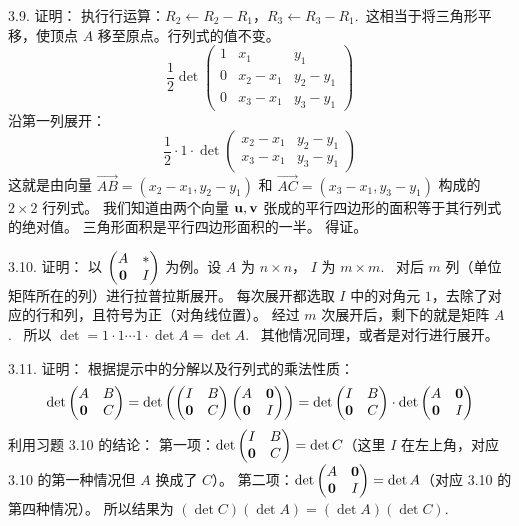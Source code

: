 \begin{exer}
3.9. 证明：
执行行运算：$R_2 \leftarrow R_2 - R_1$，$R_3 \leftarrow R_3 - R_1$.~这相当于将三角形平移，使顶点 $A$ 移至原点。行列式的值不变。
$$ \frac{1}{2} \det \begin{pmatrix} 1 & x_1 & y_1 \\ 0 & x_2-x_1 & y_2-y_1 \\ 0 & x_3-x_1 & y_3-y_1 \end{pmatrix} $$
沿第一列展开：
$$ \frac{1}{2} \cdot 1 \cdot \det \begin{pmatrix} x_2-x_1 & y_2-y_1 \\ x_3-x_1 & y_3-y_1 \end{pmatrix} $$
这就是由向量 $\vec{AB} = (x_2-x_1, y_2-y_1)$ 和 $\vec{AC} = (x_3-x_1, y_3-y_1)$ 构成的 $2 \times 2$ 行列式。
我们知道由两个向量 $\mathbf{u}, \mathbf{v}$ 张成的平行四边形的面积等于其行列式的绝对值。
三角形面积是平行四边形面积的一半。
得证。

3.10. 证明：
以 $\begin{pmatrix} A & * \\ \mathbf{0} & I \end{pmatrix}$ 为例。设 $A$ 为 $n \times n$， $I$ 为 $m \times m$.~
对后 $m$ 列（单位矩阵所在的列）进行拉普拉斯展开。
每次展开都选取 $I$ 中的对角元 $1$，去除了对应的行和列，且符号为正（对角线位置）。
经过 $m$ 次展开后，剩下的就是矩阵 $A$.~
所以 $\det = 1 \cdot 1 \cdots 1 \cdot \det A = \det A$.~
其他情况同理，或者是对行进行展开。

3.11. 证明：
根据提示中的分解以及行列式的乘法性质：
$$ \det \begin{pmatrix} A & B \\ \mathbf{0} & C \end{pmatrix} = \det \left( \begin{pmatrix} I & B \\ \mathbf{0} & C \end{pmatrix} \begin{pmatrix} A & \mathbf{0} \\ \mathbf{0} & I \end{pmatrix} \right) = \det \begin{pmatrix} I & B \\ \mathbf{0} & C \end{pmatrix} \cdot \det \begin{pmatrix} A & \mathbf{0} \\ \mathbf{0} & I \end{pmatrix} $$
利用习题 3.10 的结论：
第一项：$\det \begin{pmatrix} I & B \\ \mathbf{0} & C \end{pmatrix} = \det C$（这里 $I$ 在左上角，对应 3.10 的第一种情况但 $A$ 换成了 $C$）。
第二项：$\det \begin{pmatrix} A & \mathbf{0} \\ \mathbf{0} & I \end{pmatrix} = \det A$（对应 3.10 的第四种情况）。
所以结果为 $(\det C)(\det A) = (\det A)(\det C)$.~


\end{exer}
